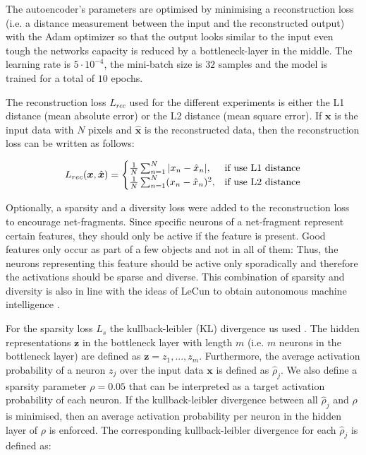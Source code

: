 The autoencoder's parameters are optimised by minimising a reconstruction loss (i.e. a distance measurement between the input and the reconstructed output) with the Adam optimizer  so that the output looks similar to the input even tough the networks capacity is reduced by a bottleneck-layer in the middle.
The learning rate is $5 \cdot 10^{-4}$, the mini-batch size is $32$ samples and the model is trained for a total of $10$ epochs.

The reconstruction loss $L_{rec}$ used for the different experiments is either the L1 distance (mean absolute error) or the L2 distance (mean square error). If $\boldsymbol{x}$ is the input data with $N$ pixels and $\hat{\boldsymbol{x}}$ is the reconstructed data, then the reconstruction loss can be written as follows:

\begin{equation}\eqlbl{ae_recon}
		L_{rec}(\boldsymbol{x}, \hat{\boldsymbol{x}}) = \begin{cases}
      		\frac{1}{N} \sum^{N}_{n=1}|x_n - \hat{x}_n|, & \text{if use L1 distance}\\
      		\frac{1}{N} \sum^{N}_{n=1} (x_n - \hat{x}_n)^2, & \text{if use L2 distance}
    	\end{cases}
\end{equation}


Optionally, a sparsity and a diversity loss were added to the reconstruction loss to encourage net-fragments.
Since specific neurons of a net-fragment represent certain features, they should only be active if the feature is present.
Good features only occur as part of a few objects and not in all of them: Thus, the neurons representing this feature should be active only sporadically and therefore the activations should be sparse and diverse.
This combination of sparsity and diversity is also in line with the ideas of LeCun to obtain autonomous machine intelligence .


For the sparsity loss $L_{s}$ the kullback-leibler (KL) divergence us used .
The hidden representations $\boldsymbol{z}$ in the bottleneck layer with length $m$ (i.e. $m$ neurons in the bottleneck layer) are defined as $\boldsymbol{z} = z_1, ..., z_m$.
Furthermore, the average activation probability of a neuron $z_j$ over the input data $\boldsymbol{x}$ is defined as $\hat{\rho}_j$. We also define a sparsity parameter $\rho=0.05$ that can be interpreted as a target activation probability of each neuron. If the kullback-leibler divergence between all $\hat{\rho}_j$ and $\rho$ is minimised, then an average activation probability per neuron in the hidden layer of $\rho$ is enforced. The corresponding kullback-leibler divergence for each $\hat{\rho}_j$ is defined as:


